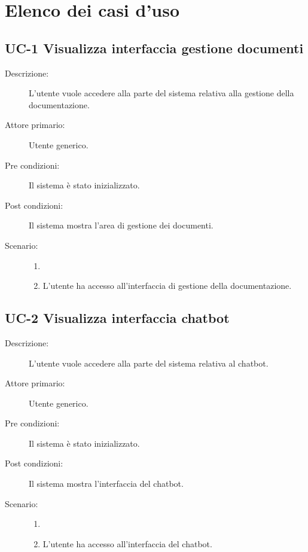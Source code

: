 \newpage

\section{Elenco dei casi d'uso}

\subsection{UC-1 Visualizza interfaccia gestione documenti}
\begin{description}
    \item[Descrizione:] L’utente vuole accedere alla parte del sistema relativa alla gestione della documentazione.
    \item[Attore primario:] Utente generico.
    \item[Pre condizioni:]  Il sistema è stato inizializzato.
    \item[Post condizioni:] Il sistema mostra l’area di gestione dei documenti.
    \item[Scenario:] 
    \begin{enumerate}
        \item[] 
        \item L’utente ha accesso all’interfaccia di gestione della documentazione.
    \end{enumerate}
\end{description}

\subsection{UC-2 Visualizza interfaccia chatbot}
\begin{description}
    \item[Descrizione:] L’utente vuole accedere alla parte del sistema relativa al chatbot.
    \item[Attore primario:] Utente generico.
    \item[Pre condizioni:] Il sistema è stato inizializzato.
    \item[Post condizioni:] Il sistema mostra l’interfaccia del chatbot.
    \item[Scenario:] 
    \begin{enumerate}
        \item[] 
        \item L’utente ha accesso all’interfaccia del chatbot.
    \end{enumerate}
\end{description}

